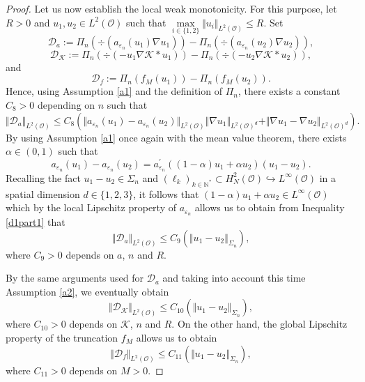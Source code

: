 \documentclass[10pt,number,preprint,times]{elsarticle}
\numberwithin{equation}{section} %
\begin{document}
\begin{proof}
Let us now establish the local weak monotonicity. For this purpose, let $R>0$ and $u_1,u_2 \in L^2(\mathcal{O})$ such that $\underset{i \in \{1,2\}}{\max} \Vert u_i \Vert_{L^2(\mathcal{O})} \leq R$. Set 
$$
\mathscr{D}_a:=\Pi_n\left(\div\left(a_{\varepsilon_n}(u_1) \nabla u_1\right)\right)-\Pi_n\left(\div\left(a_{\varepsilon_n}(u_2) \nabla u_2\right)\right),
$$
$$
\mathscr{D}_\mathcal{K}:=\Pi_n\left(\div\left(-u_1\nabla \mathcal{K} \ast u_1\right)\right)-\Pi_n\left(\div\left(-u_2\nabla \mathcal{K} \ast u_2\right)\right),
$$
and 
$$
\mathscr{D}_f:=\Pi_n\left( f_M(u_1)\right)-\Pi_n\left(f_M(u_2)\right).
$$
Hence, using Assumption \ref{a1} and the definition of $\Pi_n$, there exists a constant $C_8>0$ depending on $n$ such that
\begin{equation}\label{d1part1}
\Vert \mathscr{D}_a \Vert_{L^2(\mathcal{O})} \leq C_8\left(\Vert a_{\varepsilon_n} (u_1)-a_{\varepsilon_n}(u_2) \Vert_{L^2(\mathcal{O})} \Vert \nabla u_1 \Vert_{L^2(\mathcal{O})^d}+\Vert \nabla u_1-\nabla u_2 \Vert_{L^2(\mathcal{O})^d}\right).
\end{equation}
By using Assumption \ref{a1} once again with the mean value theorem, there exists $\alpha \in (0,1)$ such that
$$
a_{\varepsilon_n}(u_1)-a_{\varepsilon_n}(u_2)=a_{\varepsilon_n}^\prime(\left(1-\alpha\right)u_1+\alpha u_2)(u_1-u_2).
$$
Recalling the fact $u_1-u_2 \in \Sigma_n$ and  $\left(\ell_k\right)_{k \in \mathbb{N}^*} \subset H_N^2(\mathcal{O}) \hookrightarrow L^\infty(\mathcal{O})$ in a spatial dimension $d \in \{1,2,3\}$, it follows that $\left(1-\alpha\right)u_1+\alpha u_2 \in L^\infty(\mathcal{O})$ which by the local Lipschitz property of $a_{\varepsilon_n}$ allows us to obtain from Inequality \eqref{d1part1} that
\begin{equation}\label{d1part2}
	\Vert \mathscr{D}_a \Vert_{L^2(\mathcal{O})} \leq C_9\left(\Vert u_1-u_2 \Vert_{\Sigma_n}\right),
\end{equation}
where $C_9>0$ depends on $a$, $n$ and $R$.

\noindent
By the same arguments used for $\mathcal{D}_a$ and taking into account this time Assumption \ref{a2}, we eventually obtain
\begin{equation}\label{dk}
	\Vert \mathscr{D}_{\mathcal{K}} \Vert_{L^2(\mathcal{O})} \leq C_{10}\left(\Vert u_1-u_2 \Vert_{\Sigma_n}\right),
\end{equation}
where $C_{10}>0$ depends on $\mathcal{K}$, $n$ and $R$.
\noindent
On the other hand, the global Lipschitz property of the truncation $f_M$ allows us to obtain 
\begin{equation}\label{df}
	\Vert \mathscr{D}_{f} \Vert_{L^2(\mathcal{O})} \leq C_{11}\left(\Vert u_1-u_2 \Vert_{\Sigma_n}\right),
\end{equation}
where $C_{11}>0$ depends on $M>0$.



\end{proof}
\end{document}

